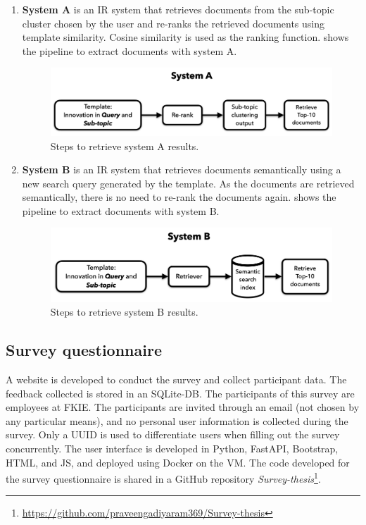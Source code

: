 \begin{enumerate}
	\item 	\textbf{System A} is an \ac{IR} system that retrieves documents from the sub-topic cluster chosen by the user and re-ranks the retrieved documents using template similarity. Cosine similarity is used as the ranking function.  shows the pipeline to extract documents with system A.
	
	
\begin{figure}[h]
	\centering
	\includegraphics[width=.9\textwidth]{images/thesis_images/systemA.png}
		\caption{Steps to retrieve system A results. \label{fig:systemA}}
\end{figure}
	
	\item 	\textbf{System B} is an \ac{IR} system that retrieves documents semantically using a new search query generated by the template. As the documents are retrieved semantically, there is no need to re-rank the documents again.  shows the pipeline to extract documents with system B.
	
	
	\begin{figure}[h]
		\centering
		\includegraphics[width=.9\textwidth]{images/thesis_images/systemB.png}
		\caption{Steps to retrieve system B results. \label{fig:systemB}}
	\end{figure}
	
\end{enumerate}

\subsection{Survey questionnaire}

A website is developed to conduct the survey and collect participant data. The feedback collected is stored in an SQLite-DB. The participants of this survey are employees at \ac{FKIE}. The participants are invited through an email (not chosen by any particular means), and no personal user information is collected during the survey. Only a \ac{UUID} is used to differentiate users when filling out the survey concurrently. The user interface is developed in Python, FastAPI, Bootstrap, \ac{HTML}, and \ac{JS}, and deployed using Docker on the \ac{VM}. The code developed for the survey questionnaire is shared in a GitHub repository \textit{Survey-thesis}\footnote{\url{https://github.com/praveengadiyaram369/Survey-thesis}}.


